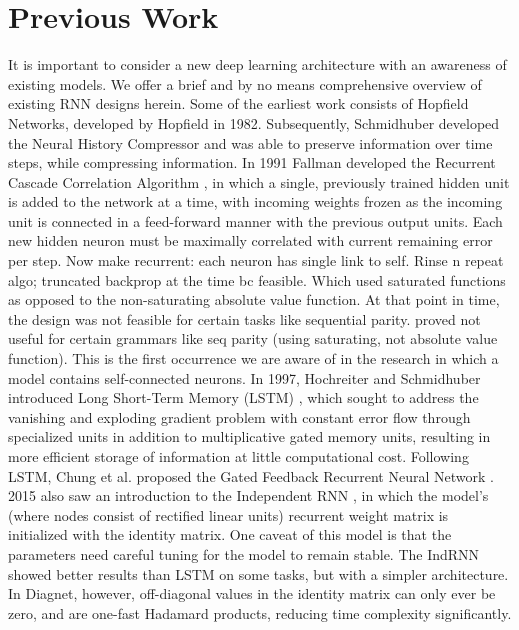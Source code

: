 \documentclass{article}
\begin{document}
\section{Previous Work}
\label{gen_inst}
It is important to consider a new deep learning architecture with an awareness of existing models.  We offer a brief and by no means comprehensive overview of existing RNN designs herein.  
Some of the earliest work consists of Hopfield Networks, developed by Hopfield in 1982.  Subsequently, Schmidhuber  developed the Neural History Compressor and was able to preserve information over time steps, while compressing information.  In 1991 Fallman developed the Recurrent Cascade Correlation Algorithm \citet{Fahlman1990TheRC}, in which a single, previously trained hidden unit is added to the network at a time, with incoming weights frozen as the incoming unit is connected in a feed-forward manner with the previous output units. Each new hidden neuron must be maximally correlated with current remaining error per step.  Now make recurrent: each neuron has single link to self.  Rinse n repeat algo; truncated backprop at the time bc feasible.  Which used saturated functions as opposed to the non-saturating absolute value function.  At that point in time, the design was not feasible for certain tasks like sequential parity.  proved not useful for certain grammars like seq parity (using saturating, not absolute value function). This is the first occurrence we are aware of in the research in which a model contains self-connected neurons.  
In 1997, Hochreiter and Schmidhuber introduced Long Short-Term Memory (LSTM) , which sought to address the vanishing and exploding gradient problem with constant error flow through specialized units in addition to multiplicative gated memory units, resulting in more efficient storage of information at little computational cost.  
Following LSTM, Chung et al. proposed the Gated Feedback Recurrent Neural Network .  2015 also saw an introduction to the Independent RNN , in which the model's (where nodes consist of rectified linear units) recurrent weight matrix is initialized with the identity matrix.  One caveat of this model is that the parameters need careful tuning for the model to remain stable.  The IndRNN showed better results than LSTM on some tasks, but with a simpler architecture.  In Diagnet, however, off-diagonal values in the identity matrix can only ever be zero, and are one-fast Hadamard products, reducing time complexity significantly. 
\end{document}
